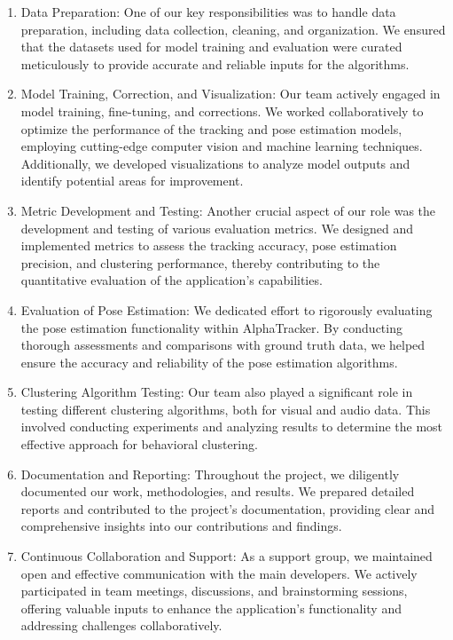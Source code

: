 \documentclass[
  11pt,
]{article}
\begin{document}
\begin{enumerate}
\def\labelenumi{\arabic{enumi}.}
\item
  Data Preparation: One of our key responsibilities was to handle data
  preparation, including data collection, cleaning, and organization. We
  ensured that the datasets used for model training and evaluation were
  curated meticulously to provide accurate and reliable inputs for the
  algorithms.
\item
  Model Training, Correction, and Visualization: Our team actively
  engaged in model training, fine-tuning, and corrections. We worked
  collaboratively to optimize the performance of the tracking and pose
  estimation models, employing cutting-edge computer vision and machine
  learning techniques. Additionally, we developed visualizations to
  analyze model outputs and identify potential areas for improvement.
\item
  Metric Development and Testing: Another crucial aspect of our role was
  the development and testing of various evaluation metrics. We designed
  and implemented metrics to assess the tracking accuracy, pose
  estimation precision, and clustering performance, thereby contributing
  to the quantitative evaluation of the application's capabilities.
\item
  Evaluation of Pose Estimation: We dedicated effort to rigorously
  evaluating the pose estimation functionality within AlphaTracker. By
  conducting thorough assessments and comparisons with ground truth
  data, we helped ensure the accuracy and reliability of the pose
  estimation algorithms.
\item
  Clustering Algorithm Testing: Our team also played a significant role
  in testing different clustering algorithms, both for visual and audio
  data. This involved conducting experiments and analyzing results to
  determine the most effective approach for behavioral clustering.
\item
  Documentation and Reporting: Throughout the project, we diligently
  documented our work, methodologies, and results. We prepared detailed
  reports and contributed to the project's documentation, providing
  clear and comprehensive insights into our contributions and findings.
\item
  Continuous Collaboration and Support: As a support group, we
  maintained open and effective communication with the main developers.
  We actively participated in team meetings, discussions, and
  brainstorming sessions, offering valuable inputs to enhance the
  application's functionality and addressing challenges collaboratively.
\end{enumerate}
\end{document}
